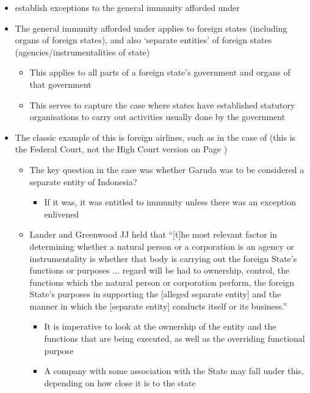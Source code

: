 \begin{itemize}
    \item {} establish exceptions to the general immunity afforded under 
    \item The general immunity afforded under  applies to foreign states (including organs of foreign states), and also `separate entities' of foreign states (agencies/instrumentalities of state)
    \begin{itemize}
        \item This applies to all parts of a foreign state's government and organs of that government
        \item This serves to capture the case where states have established statutory organisations to carry out activities usually done by the government
    \end{itemize}
    \item The classic example of this is foreign airlines, such as in the case of  (this is the Federal Court, not the High Court version on Page \pageref{case:ACCC v Garuda})
    \begin{itemize}
        \item The key question in the case was whether Garuda was to be considered a separate entity of Indonesia?
        \begin{itemize}
            \item If it was, it was entitled to immunity unless there was an exception enlivened
        \end{itemize}
        \item Lander and Greenwood JJ held that ``[t]he most relevant factor in determining whether a natural person or a corporation is an agency or instrumentality is whether that body is carrying out the foreign State's functions or purposes ... regard will be had to ownership, control, the functions which the natural person or corporation perform, the foreign State's purposes in supporting the [alleged separate entity] and the manner in which the [separate entity] conducts itself or its business.''
        \begin{itemize}
            \item It is imperative to look at the ownership of the entity and the functions that are being executed, as well as the overriding functional purpose
            \item A company with some association with the State may fall under this, depending on how close it is to the state

\end{itemize}
\end{itemize}
\end{itemize}
